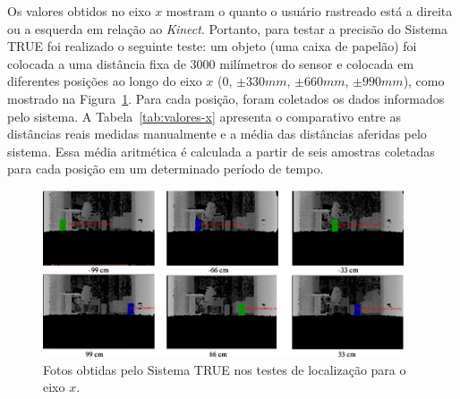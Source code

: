	Os valores obtidos no eixo $\displaystyle x$ mostram o quanto o usuário
	rastreado está a direita ou a esquerda em relação ao \textit{Kinect}. Portanto,
	para testar a precisão do Sistema TRUE foi realizado o seguinte teste: um objeto
	(uma caixa de papelão) foi colocada a uma distância fixa de 3000 milímetros do
	sensor e colocada em diferentes posições ao longo do eixo $\displaystyle x$ (0,
	$\displaystyle \pm330mm$, $\displaystyle \pm660mm$, $\displaystyle \pm990mm$),
	como mostrado na Figura~\ref{fig:eixox-imgs}. Para cada posição, foram
	coletados os dados informados pelo sistema. A Tabela~\ref{tab:valores-x}
	apresenta o comparativo entre as distâncias reais medidas manualmente e a
	média das distâncias aferidas pelo sistema. Essa média aritmética é calculada
	a partir de seis amostras coletadas para cada posição em um determinado período de tempo.


	\begin{figure}[htb]
		\begin{center}
			\includegraphics[width=0.95\textwidth]{figuras/5.Testes/eixox-imgs2.png}
		\end{center}
		\caption{Fotos obtidas pelo Sistema TRUE nos testes de localização para o eixo $\displaystyle x$.}
		\label{fig:eixox-imgs}
	\end{figure}

